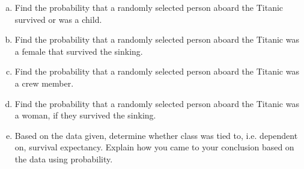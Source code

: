 \documentclass[12pt,letterpaper]{exam}
\begin{document}
\begin{questions}
\begin{enumerate}[(a)]
\item Find the probability that a randomly selected person aboard the Titanic survived or was a child.  
\item Find the probability that a randomly selected person aboard the Titanic was a female that survived the sinking.
\item Find the probability that a randomly selected person aboard the Titanic was a crew member.
\item Find the probability that a randomly selected person aboard the Titanic was a woman, if they survived the sinking.
\item Based on the data given, determine whether class was tied to, i.e. dependent on, survival expectancy. Explain how you came to your conclusion based on the data using probability.  
\end{enumerate}


\end{questions}
\end{document}

